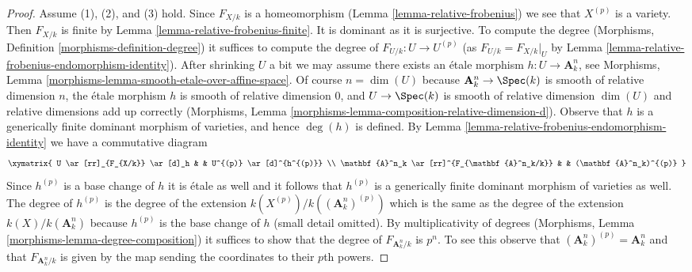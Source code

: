 \begin{proof}
\medskip\noindent
Assume (1), (2), and (3) hold. Since $F_{X/k}$ is a homeomorphism
(Lemma \ref{lemma-relative-frobenius}) we see that $X^{(p)}$ is a variety.
Then $F_{X/k}$ is finite by Lemma \ref{lemma-relative-frobenius-finite}.
It is dominant as it is surjective. To compute the degree
(Morphisms, Definition \ref{morphisms-definition-degree})
it suffices to compute the degree of $F_{U/k} : U \to U^{(p)}$
(as $F_{U/k} = F_{X/k}|_U$ by
Lemma \ref{lemma-relative-frobenius-endomorphism-identity}).
After shrinking $U$ a bit we may assume there exists an
\'etale morphism $h : U \to \mathbf{A}^n_k$, see
Morphisms, Lemma \ref{morphisms-lemma-smooth-etale-over-affine-space}.
Of course $n = \dim(U)$ because
$\mathbf{A}^n_k \to \Spec(k)$ is smooth of relative dimension $n$,
the \'etale morphism $h$ is smooth of relative dimension $0$, and
$U \to \Spec(k)$ is smooth of relative dimension $\dim(U)$
and relative dimensions add up correctly
(Morphisms, Lemma \ref{morphisms-lemma-composition-relative-dimension-d}).
Observe that $h$ is a generically finite dominant morphism
of varieties, and hence $\deg(h)$ is defined.
By Lemma \ref{lemma-relative-frobenius-endomorphism-identity}
we have a commutative diagram
$$
\xymatrix{
U \ar[rr]_{F_{X/k}} \ar[d]_h & & U^{(p)} \ar[d]^{h^{(p)}} \\
\mathbf{A}^n_k \ar[rr]^{F_{\mathbf{A}^n_k/k}} & &
(\mathbf{A}^n_k)^{(p)}
}
$$
Since $h^{(p)}$ is a base change of $h$ it is \'etale as well
and it follows that $h^{(p)}$ is a generically finite dominant
morphism of varieties as well. The degree of $h^{(p)}$ is the
degree of the extension $k(X^{(p)})/k((\mathbf{A}^n_k)^{(p)})$
which is the same as the degree of the extension $k(X)/k(\mathbf{A}^n_k)$
because $h^{(p)}$ is the base change of $h$ (small detail omitted).
By multiplicativity of degrees
(Morphisms, Lemma \ref{morphisms-lemma-degree-composition})
it suffices to show that the degree of $F_{\mathbf{A}^n_k/k}$
is $p^n$. To see this observe that
$(\mathbf{A}^n_k)^{(p)} = \mathbf{A}^n_k$ and that
$F_{\mathbf{A}^n_k/k}$ is given by the map sending the
coordinates to their $p$th powers.
\end{proof}

